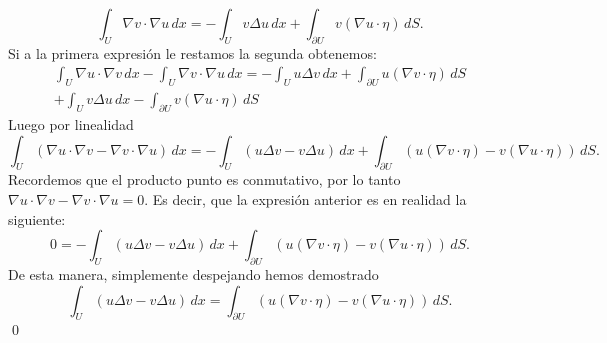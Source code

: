 \documentclass{article}
\begin{document}
\begin{homeworkProblem}[1]
\begin{itemize}
\begin{solucion}
            $$\int_U\nabla v\cdot\nabla u\,dx=-\int_U v\Delta u\,dx+\int_{\partial U}v(\nabla u\cdot\eta)\,dS.$$ 
            Si a la primera expresión le restamos la segunda obtenemos:\
            \begin{multline*}
                \int_U\nabla u\cdot\nabla v\,dx-\int_U\nabla v\cdot\nabla u\,dx=-\int_U u\Delta v\,dx+\int_{\partial U}u(\nabla v\cdot\eta)\,dS
                \\+\int_U v\Delta u\,dx-\int_{\partial U}v(\nabla u\cdot\eta)\,dS
            \end{multline*}
            Luego por linealidad
            $$\int_U(\nabla u\cdot\nabla v-\nabla v\cdot\nabla u)\,dx=-\int_{U}(u\Delta v-v\Delta u)\,dx+\int_{\partial U}\left(u(\nabla v\cdot\eta)-v(\nabla u\cdot\eta)\right)\,dS.$$
            Recordemos que el producto punto es conmutativo, por lo tanto $\nabla u\cdot\nabla v-\nabla v\cdot\nabla u=0$. Es decir, que la expresión anterior es en realidad la siguiente:
            $$0=-\int_{U}(u\Delta v-v\Delta u)\,dx+\int_{\partial U}\left(u(\nabla v\cdot\eta)-v(\nabla u\cdot\eta)\right)\,dS.$$
            De esta manera, simplemente despejando hemos demostrado
            $$\int_{U}(u\Delta v-v\Delta u)\,dx=\int_{\partial U}\left(u(\nabla v\cdot\eta)-v(\nabla u\cdot\eta)\right)\,dS.$$
            \qed
        \end{solucion}
    \end{itemize}
\end{homeworkProblem}
\newpage
\end{document}
